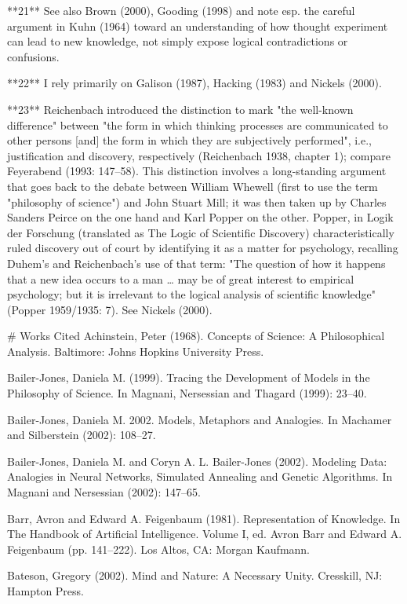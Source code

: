 **21** See also Brown (2000), Gooding (1998) and note esp. the careful argument in Kuhn (1964) toward an understanding of how thought experiment can lead to new knowledge, not simply expose logical contradictions or confusions.

**22** I rely primarily on Galison (1987), Hacking (1983) and Nickels (2000).

**23** Reichenbach introduced the distinction to mark "the well-known difference" between "the form in which thinking processes are communicated to other persons [and] the form in which they are subjectively performed", i.e., justification and discovery, respectively (Reichenbach 1938, chapter 1); compare Feyerabend (1993: 147–58). This distinction involves a long-standing argument that goes back to the debate between William Whewell (first to use the term "philosophy of science") and John Stuart Mill; it was then taken up by Charles Sanders Peirce on the one hand and Karl Popper on the other. Popper, in Logik der Forschung (translated as The Logic of Scientific Discovery) characteristically ruled discovery out of court by identifying it as a matter for psychology, recalling Duhem's and Reichenbach's use of that term: "The question of how it happens that a new idea occurs to a man … may be of great interest to empirical psychology; but it is irrelevant to the logical analysis of scientific knowledge" (Popper 1959/1935: 7). See Nickels (2000).

# Works Cited
Achinstein, Peter (1968). Concepts of Science: A Philosophical Analysis. Baltimore: Johns Hopkins University Press.

Bailer-Jones, Daniela M. (1999). Tracing the Development of Models in the Philosophy of Science. In Magnani, Nersessian and Thagard (1999): 23–40.

Bailer-Jones, Daniela M. 2002. Models, Metaphors and Analogies. In Machamer and Silberstein (2002): 108–27.

Bailer-Jones, Daniela M. and Coryn A. L. Bailer-Jones (2002). Modeling Data: Analogies in Neural Networks, Simulated Annealing and Genetic Algorithms. In Magnani and Nersessian (2002): 147–65.

Barr, Avron and Edward A. Feigenbaum (1981). Representation of Knowledge. In The Handbook of Artificial Intelligence. Volume I, ed. Avron Barr and Edward A. Feigenbaum (pp. 141–222). Los Altos, CA: Morgan Kaufmann.

Bateson, Gregory (2002). Mind and Nature: A Necessary Unity. Cresskill, NJ: Hampton Press.


